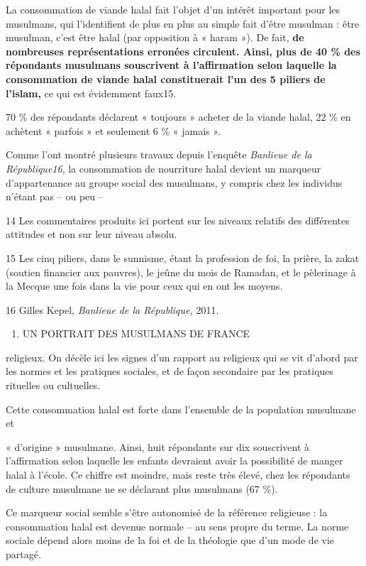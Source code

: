 La consommation de viande halal fait l'objet d'un intérêt important pour
les musulmans, qui l'identifient de plus en plus au simple fait d'être
musulman : être musulman, c'est être halal (par opposition à « haram »).
De fait, \textbf{de nombreuses représentations erronées circulent.
Ainsi, plus de 40 \% des répondants musulmans souscrivent à
l'affirmation selon laquelle la consommation de viande halal
constituerait l'un des 5 piliers de l'islam,} ce qui est évidemment
faux15.

70 \% des répondants déclarent « toujours » acheter de la viande halal,
22 \% en achètent « parfois » et seulement 6 \% « jamais ».

Comme l'ont montré plusieurs travaux depuis l'enquête \emph{Banlieue de
la République16}, la consommation de nourriture halal devient un
marqueur d'appartenance au groupe social des musulmans, y compris chez
les individus n'étant pas -- ou peu --

14 Les commentaires produits ici portent sur les niveaux relatifs des
différentes attitudes et non sur leur niveau absolu.

15 Les cinq piliers, dans le sunnisme, étant la profession de foi, la
prière, la zakat (soutien financier aux pauvres), le jeûne du mois de
Ramadan, et le pèlerinage à la Mecque une fois dans la vie pour ceux qui
en ont les moyens.

16 Gilles Kepel, \emph{Banlieue de la République,} 2011.


\begin{enumerate}
\def\labelenumi{\Roman{enumi}.}
\item
  UN PORTRAIT DES MUSULMANS DE FRANCE
\end{enumerate}


religieux. On décèle ici les signes d'un rapport au religieux qui se vit
d'abord par les normes et les pratiques sociales, et de façon secondaire
par les pratiques rituelles ou cultuelles.

Cette consommation halal est forte dans l'ensemble de la population
musulmane et

« d'origine » musulmane. Ainsi, huit répondants sur dix souscrivent à
l'affirmation selon laquelle les enfants devraient avoir la possibilité
de manger halal à l'école. Ce chiffre est moindre, mais reste très
élevé, chez les répondants de culture musulmane ne se déclarant plus
musulmans (67 \%).

Ce marqueur social semble s'être autonomisé de la référence religieuse :
la consommation halal est devenue normale -- au sens propre du terme. La
norme sociale dépend alors moins de la foi et de la théologie que d'un
mode de vie partagé.

